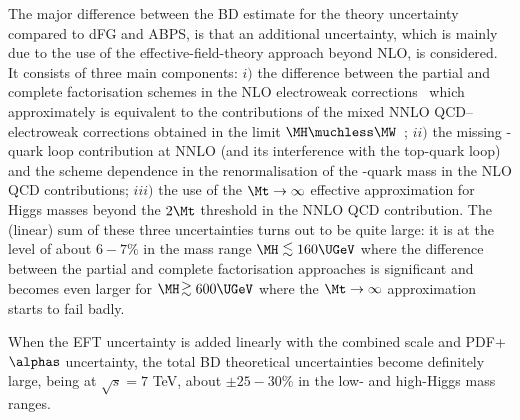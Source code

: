 The major difference between the BD estimate for the theory uncertainty compared
to dFG and ABPS, is that an additional uncertainty, which is mainly due to the
use of the effective-field-theory approach beyond NLO,  is considered. It
consists of three main components: $i)$ the difference between the partial and
complete factorisation schemes in the NLO electroweak 
corrections~\cite{Actis:2008ug} which
approximately is equivalent to the contributions of the mixed NNLO
QCD--electroweak corrections obtained in the limit  $\MH\muchless \MW$~\cite{Anastasiou:2008tj}; $ii)$ 
the missing \PQb-quark loop contribution at NNLO (and its interference with the
top-quark loop) and the scheme dependence in the renormalisation of the
\PQb-quark mass in the NLO QCD contributions; $iii)$ the use of the $\Mt \to
\infty$ effective approximation  for Higgs masses beyond the $2\Mt$ threshold in
the NNLO QCD contribution. The (linear) sum of these three uncertainties turns
out to be quite large: it is at the  level of about $6{-}7\%$ in the mass range
$\MH \lsim 160\UGeV$ where the  difference between the partial and complete
factorisation approaches is significant and becomes even larger for $\MH\!
\gsim 600\UGeV$ where the $\Mt \to \infty$ approximation starts to fail
badly. 

When the EFT uncertainty is added linearly with the combined scale and
PDF+$\alphas$ uncertainty, the total BD theoretical uncertainties
become definitely large, being at $\sqrt s=7$ TeV, about $\pm 25{-}30\%$
in the low- and high-Higgs mass  ranges.

